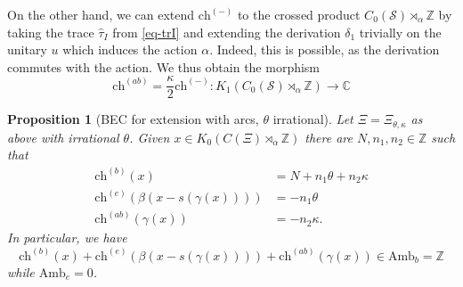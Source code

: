\documentclass[11pt]{amsart}
\newtheorem{prop}{Proposition}[section]
\newcommand{\Z}{\mathbb{Z}}
\newcommand{\C}{\mathbb{C}}
\newcommand{\cut}{\kappa}
\newcommand{\chb}{\text{ch}^{(b)}}
\newcommand{\che}{\text{ch}^{(e)}}
\newcommand{\chab}{\text{ch}^{(ab)}}
\begin{document}
On the other hand, we can extend $\mathrm{ch}^{(-)}$ to the crossed product $C_0(\mathcal S)\rtimes_\alpha\Z$ by taking the trace $\hat \tau_I$ from \eqref{eq-trI} and extending the derivation $\delta_1$ trivially on the unitary $u$ which induces the action $\alpha$. Indeed, this is possible, as the derivation commutes with the action. We thus obtain the morphism 
\begin{equation}\label{eq-chab-cut}
\chab=\frac{\cut}{2}\mathrm{ch}^{(-)}:K_1(C_0(\mathcal S)\rtimes_\alpha\Z)\to\C
\end{equation}
\begin{prop}[BEC for extension with arcs, $\theta$ irrational] 
\label{propositionBBC_TwoCuts_irrational}
Let $\Xi=\Xi_{\theta,\cut}$ as above with irrational $\theta$. 
Given $x\in K_0(C(\Xi) \rtimes_\alpha \mathbb{Z})$ there are $N,n_1,n_2\in \Z$ such that 
	\begin{align*}
		\chb(x)&=N+n_1\theta+n_2\cut\\
		\che(\beta(x-s(\gamma(x))))&=-n_1\theta\\
		\chab(\gamma(x))&=-  n_2\cut.
	\end{align*}
	In particular, we have
	$$\chb(x)+\che(\beta(x-s(\gamma(x))))+ \chab(\gamma(x))\in \mathrm{Amb}_b=\Z$$
	while $\mathrm{Amb}_e = 0$.
\end{prop}
\end{document}
